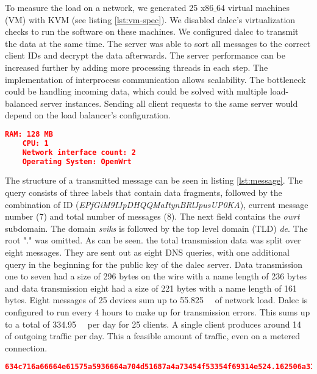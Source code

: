     To measure the load on a network, we generated 25 x86$\_$64 virtual machines (VM) with KVM (see listing \ref{lst:vm-spec}). We disabled dalec's virtualization checks to run the software on these machines. We configured dalec to transmit the data at the same time. The server was able to sort all messages to the correct client IDs and decrypt the data afterwards. The server performance can be increased further by adding more processing threads in each step. The implementation of interprocess communication allows scalability. The bottleneck could be handling incoming data, which could be solved with multiple load-balanced server instances. Sending all client requests to the same server would depend on the load balancer's configuration.\\
    \begin{lstlisting}[language=json, caption=virtual machine specifications, label=lst:vm-spec]
    RAM: 128 MB
    CPU: 1
    Network interface count: 2
    Operating System: OpenWrt
    \end{lstlisting}
    The structure of a transmitted message can be seen in listing \ref{lst:message}. The query consists of three labels that contain data fragments, followed by the combination of ID (\textit{EPfGiM9IJpDHQQMaItynBRlJpusUP0KA}), current message number (7) and total number of messages (8).     The next field contains the \textit{owrt} subdomain. The domain \textit{sviks} is followed by the top level domain (TLD) \textit{de}. The root "." was omitted.
    As can be seen. the total transmission data was split over eight messages.
    They are sent out as eight DNS queries, with one additional query in the beginning for the public key of the dalec server.
    Data transmission one to seven had a size of 296 bytes on the wire with a name length of 236 bytes and data transmission eight had a size of 221 bytes with a name length of 161 bytes. Eight messages of  25 devices sum up to \SIlist{55.825}{\kilo\byte} of network load. Dalec is configured to run every 4 hours to make up for transmission errors. 
    This sums up to a total of \SIlist{334.95}{\kilo\byte} per day for 25 clients. 
    A single client produces around \SIlist{14}{\kilo\byte} of outgoing traffic per day.
    This a feasible amount of traffic, even on a metered connection.

    \begin{lstlisting}[language=json, caption=Layout of dalec message, label=lst:message]
634c716a66664e61575a5936664a704d51687a4a73454f53354f69314e524.162506a310a636136794752496d36794c5352626a6a464d765532636f4835.7258694279492b6b714c65507138426667596a31382b597a756d544267643.EPfGiM9IJpDHQQMaItynBRlJpusUP0KA-7-8.owrt.sviks.de
    \end{lstlisting}    
    
